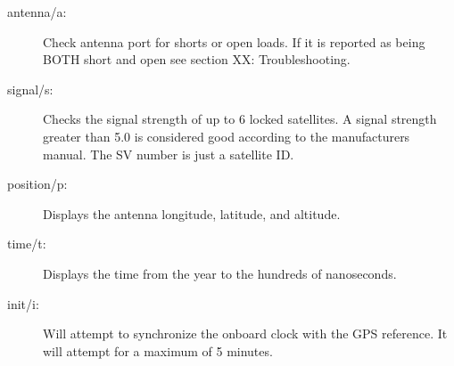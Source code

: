 \documentclass[11pt]{article}
\begin{document}
\begin{description}
 \item [antenna/a:] Check antenna port for shorts or open loads.  If it is reported as being BOTH short and open see section XX: Troubleshooting.

 \item [signal/s:] Checks the signal strength of up to 6 locked satellites.  A signal strength greater than 5.0 is considered good according to the manufacturers manual.  The SV number is just a satellite ID.

 \item [position/p:] Displays the antenna longitude, latitude, and altitude.
 
 \item [time/t:] Displays the time from the year to the hundreds of nanoseconds.

 \item [init/i:] Will attempt to synchronize the onboard clock with the GPS reference.  It will attempt for a maximum of 5 minutes.

\end{description}

\end{document}
